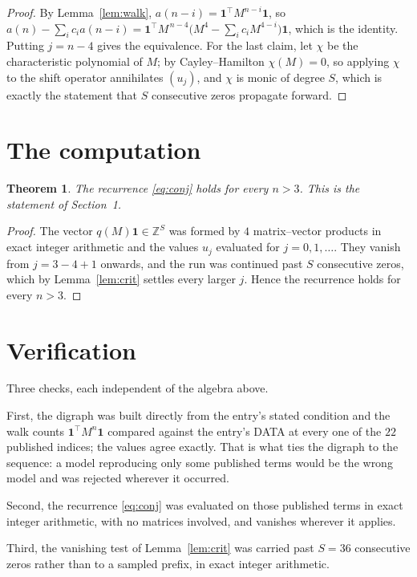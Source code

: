 \documentclass[11pt,a4paper]{article}
\theoremstyle{plain}
\newtheorem{theorem}{Theorem}
\theoremstyle{definition}
\begin{document}
\begin{proof}
By Lemma~\ref{lem:walk}, $a(n-i)=\mathbf{1}^{\!\top}M^{n-i}\mathbf{1}$, so
$a(n)-\sum_i c_i a(n-i)
=\mathbf{1}^{\!\top}M^{\,n-4}\bigl(M^{4}-\sum_i c_i M^{4-i}\bigr)
\mathbf{1}$, which is the identity. Putting $j=n-4$ gives the equivalence. For the
last claim, let $\chi$ be the characteristic polynomial of $M$; by Cayley--Hamilton
$\chi(M)=0$, so applying $\chi$ to the shift operator annihilates $(u_j)$, and $\chi$ is
monic of degree $S$, which is exactly the statement that $S$ consecutive zeros propagate
forward.
\end{proof}

\section{The computation}

\begin{theorem}
The recurrence \eqref{eq:conj} holds for every $n>3$. This is the statement of
Section~1.
\end{theorem}

\begin{proof}
The vector $q(M)\mathbf{1}\in\mathbb{Z}^{S}$ was formed by $4$ matrix--vector
products in exact integer arithmetic and the values $u_j$ evaluated for
$j=0,1,\dots$. They vanish from $j=3-4+1$ onwards, and the run was continued past
$S$ consecutive zeros, which by Lemma~\ref{lem:crit} settles every larger $j$. Hence the
recurrence holds for every $n>3$.
\end{proof}

\section{Verification}

Three checks, each independent of the algebra above.

First, the digraph was built directly from the entry's stated condition and the walk counts
$\mathbf{1}^{\!\top}M^{n}\mathbf{1}$ compared against the entry's DATA at every one of
the $22$ published indices; the values agree exactly. That is what ties the digraph to
the sequence: a model reproducing only some published terms would be the wrong model and
was rejected wherever it occurred.

Second, the recurrence \eqref{eq:conj} was evaluated on those published terms in exact
integer arithmetic, with no matrices involved, and vanishes wherever it applies.

Third, the vanishing test of Lemma~\ref{lem:crit} was carried past $S=36$ consecutive
zeros rather than to a sampled prefix, in exact integer arithmetic.
\end{document}
